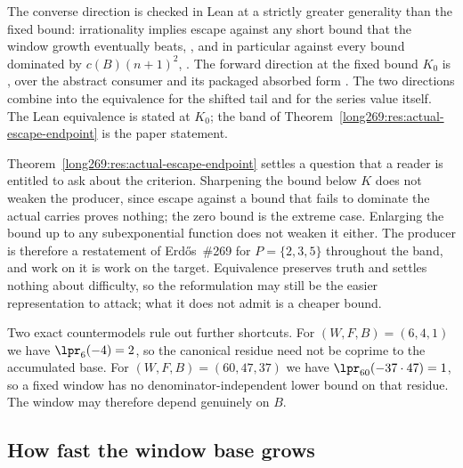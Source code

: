 \noindent The converse direction is checked in Lean at a strictly greater
generality than the fixed bound: irrationality implies escape against any short
bound that the window growth eventually beats,
,
and in particular against every bound dominated by $c(B)(n+1)^{2}$,
.
The forward direction at the fixed bound $K_0$ is
,
over the abstract consumer
and its packaged absorbed form
.
The two directions combine into the equivalence
for the shifted tail and
for the series value itself.  The Lean equivalence is stated at $K_0$; the band
of Theorem~\ref{long269:res:actual-escape-endpoint} is the paper statement.

Theorem~\ref{long269:res:actual-escape-endpoint} settles a question that a reader is
entitled to ask about the criterion.  Sharpening the bound below $K$ does not
weaken the producer, since escape against a bound that fails to dominate the
actual carries proves nothing; the zero bound is the extreme case.  Enlarging
the bound up to any subexponential function does not weaken it either.  The
producer is therefore a restatement of Erd\H{o}s~\#269 for $P=\{2,3,5\}$
throughout the band, and work on it is work on the target.  Equivalence
preserves truth and settles nothing about difficulty, so the reformulation may
still be the easier representation to attack; what it does not admit is a
cheaper bound.

Two exact countermodels rule out further shortcuts.  For $(W,F,B)=(6,4,1)$ we
have $\lpr_6(-4)=2$, so the canonical residue need not be coprime to the
accumulated base.  For $(W,F,B)=(60,47,37)$ we have
$\lpr_{60}(-37\cdot47)=1$, so a fixed window has no denominator-independent
lower bound on that residue.  The window may therefore depend genuinely on $B$.

\subsection{How fast the window base grows}

